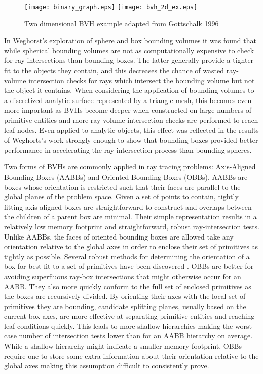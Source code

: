 \begin{figure}[H]
  \centering
  \texttt{[image: binary\_graph.eps]}
  \texttt{[image: bvh\_2d\_ex.eps]}
  \caption{Two dimensional BVH example adapted from Gottschalk 1996 \cite{Gottschalk_1996}}
  \label{fig:2D_bvh}
\end{figure}

In Weghorst's exploration of sphere and box bounding volumes it was found that
while spherical bounding volumes are not as computationally expensive to check
for ray intersections than bounding boxes. The latter generally provide a
tighter fit to the objects they contain, and this decreases the chance of wasted
ray-volume intersection checks for rays which intersect the bounding volume but
not the object it contains. When considering the application of bounding volumes
to a discretized analytic surface represented by a triangle mesh, this becomes
even more important as BVHs become deeper when constructed on large numbers of
primitive entities and more ray-volume intersection checks are performed to
reach leaf nodes. Even applied to analytic objects, this effect was reflected
in the results of Weghorts's work strongly enough to show that bounding boxes
provided better performance in accelerating the ray intersection process than
bounding spheres.

Two forms of BVHs are commonly applied in ray tracing problems: Axis-Aligned
Bounding Boxes (AABBs) and Oriented Bounding Boxes (OBBs). AABBs are boxes whose
orientation is restricted such that their faces are parallel to the global
planes of the problem space. Given a set of points to contain, tightly fitting
axis aligned boxes are straightforward to construct and overlaps between the
children of a parent box are minimal. Their simple representation results in a
relatively low memory footprint and straightforward, robust ray-intersection
tests. Unlike AABBs, the faces of oriented bounding boxes are allowed take any
orientation relative to the global axes in order to enclose their set of
primitives as tightly as possible. Several robust methods for determining the
orientation of a box for best fit to a set of primitives have been discovered
\cite{Gottschalk_1996,ORourke_1985}. OBBs are better for avoiding superfluous
ray-box intersections that might otherwise occur for an AABB. They also
more quickly conform to the full set of enclosed primitives as the boxes are
recursively divided. By orienting their axes with the local set of primitives
they are bounding, candidate splitting planes, usually based on the current box
axes, are more effective at separating primitive entities and reaching leaf
conditions quickly. This leads to more shallow hierarchies making the worst-case
number of intersection tests lower than for an AABB hierarchy on
average. While a shallow hierarchy might indicate a smaller memory footprint,
OBBs require one to store some extra information about their orientation
relative to the global axes making this assumption difficult to consistently
prove.

